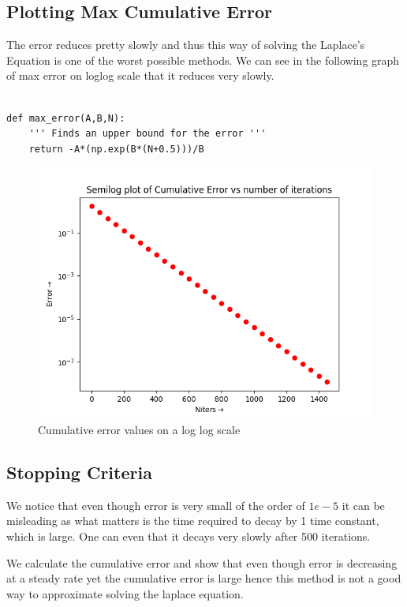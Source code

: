 \documentclass{article}
\begin{document}
\subsection{Plotting Max Cumulative Error}
The error reduces pretty slowly and thus this way of solving the Laplace's Equation is one of the worst possible methods. 
We can see in the following graph of max error on loglog scale that it reduces very slowly.
\begin{lstlisting}

def max_error(A,B,N):
    ''' Finds an upper bound for the error ''' 
    return -A*(np.exp(B*(N+0.5)))/B

\end{lstlisting}

\begin{figure}[h!]
    \centering
    \includegraphics[scale=0.6]{plots/Semilog plot of Cumulative Error vs number of iterations.png}
    \caption{Cumulative error values on a log log scale}
    \end{figure}

\subsection{Stopping Criteria}
We notice that even though error is very small of the order of $1e-5$ it can be misleading as
what matters is the time required to decay by 1 time constant, which is large. One can even
that it decays very slowly after 500 iterations.

We calculate the cumulative error and show that even though error is decreasing at a steady
rate yet the cumulative error is large hence this method is not a good way to approximate
solving the laplace equation.
\end{document}
